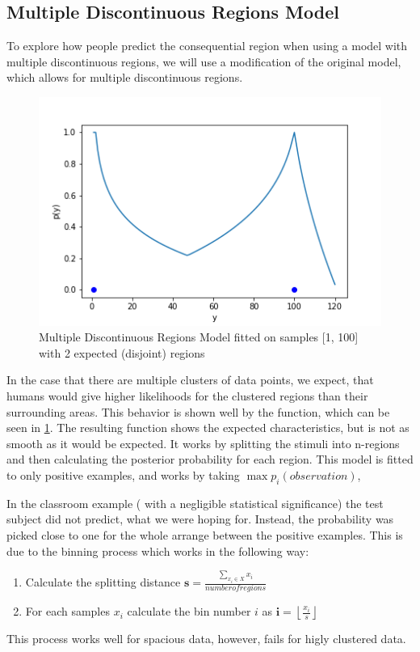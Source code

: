 \documentclass[12pt, ]{scrartcl}
\begin{document}
\begin{multicols}{2}
\section{Multiple Discontinuous Regions Model}
To explore how people predict the consequential region when using a model with multiple discontinuous regions, we will use
a modification of the original model, which allows for multiple discontinuous regions.
\begin{figure}[H]
	\centering
	\includegraphics[scale=0.5]{graphics/mprm_model}
	\caption{Multiple Discontinuous Regions Model fitted on samples [1, 100] with 2 expected (disjoint) regions}
	\label{fig:mprm}
\end{figure}
In the case that there are multiple clusters of data points, we expect, that humans would  give higher likelihoods for the clustered regions than their surrounding areas. 
This behavior is shown well by the function, which can be seen in \cref{fig:mprm}. The resulting function shows the expected characteristics, but is not as smooth as it would be expected.
It works by splitting the stimuli into n-regions and then calculating the posterior probability for each region.
This model is fitted to only positive examples, and works by taking $\max{p_i(observation)}$, 


In the classroom example ( with a negligible statistical significance) the test subject did not predict, what we were hoping for. Instead, the probability was picked close to one for the whole arrange between the positive examples.  
This is due to the binning process which works in the following way:
\begin{enumerate}
	\item Calculate the splitting distance $\textbf{s} = \frac{\sum\limits_{x_i \in X} x_i}{number of regions}$
 	\item For each samples $x_i$ calculate the bin number $i$ as $\textbf{i} = \left\lfloor \frac{x_i}{s} \right\rfloor$
\end{enumerate}
This process works well for spacious data, however, fails for higly clustered data. 

\end{multicols}
\end{document}
